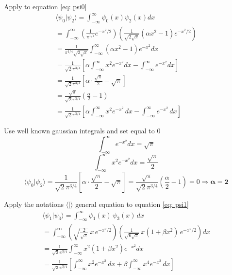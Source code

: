 \documentclass[12pt]{article}
\begin{document}
        Apply to equation \ref{eq: psi0}
        \begin{equation}
            \begin{split}
                \langle \psi_0 | \psi_2 \rangle = \int_{-\infty}^{\infty} \psi_0(x) \psi_2(x) dx \\
                = \int_{-\infty}^{\infty} \left( \frac{1}{\pi^{1/4}} e^{-x^2/2} \right) \left( \frac{1}{\sqrt{2\sqrt{\pi}}} (\alpha x^2 - 1) e^{-x^2/2} \right) \\
                = \frac{1}{\pi^{1/4} \sqrt{2\sqrt{\pi}}} \int_{-\infty}^{\infty}  (\alpha x^2 - 1) e^{-x^2} dx \\
                = \frac{1}{\sqrt{2} \pi^{3/4}} \left[ \alpha \int_{-\infty}^{\infty} x^2 e^{-x^2} dx - \int_{-\infty}^{\infty} e^{-x^2} dx \right] \\
                = \frac{1}{\sqrt{2} \pi^{3/4}} \left[ \alpha \cdot \frac{\sqrt{\pi}}{2} - \sqrt{\pi} \right] \\
                = \frac{\sqrt{\pi}}{\sqrt{2} \pi^{3/4}} \left( \frac{\alpha}{2} - 1 \right) \\
                = \frac{1}{\sqrt{2} \pi^{3/4}} \left[ \alpha \int_{-\infty}^{\infty} x^2 e^{-x^2} \, dx - \int_{-\infty}^{\infty} e^{-x^2} \, dx \right]
            \end{split}
        \end{equation}

        Use well known gaussian integrals and set equal to 0
        \[
            \int_{-\infty}^{\infty} e^{-x^2}dx = \sqrt{\pi}
        \]
        \[
            \int_{-\infty}^{\infty} x^2 e^{-x^2}dx = \frac{\sqrt{\pi}}{2}
        \]
        \[
            \langle \psi_0 | \psi_2 \rangle = \frac{1}{\sqrt{2} \pi^{3/4}} \left[ \alpha \cdot \frac{\sqrt{\pi}}{2} - \sqrt{\pi} \right] = \frac{\sqrt{\pi}}{\sqrt{2} \pi^{3/4}} \left( \frac{\alpha}{2} - 1 \right) = 0 \Rightarrow \boldsymbol{\boxed{\alpha = 2}}
        \]

        Apply the notations $\langle|\rangle$ general equation to equation \ref{eq: psi1}
        \begin{equation}
            \begin{split}
                \langle \psi_1 | \psi_3 \rangle = \int_{-\infty}^{\infty} \psi_1(x)\, \psi_3(x)\, dx \\
                = \int_{-\infty}^{\infty} \left( \sqrt{\frac{2}{\sqrt{\pi}}} \, x \, e^{-x^2/2} \right) \left( \frac{1}{\sqrt{6\sqrt{\pi}}} \, x(1 + \beta x^2) \, e^{-x^2/2} \right) dx \\
                = \frac{1}{\sqrt{3} \pi^{3/4}} \int_{-\infty}^{\infty} x^2 (1 + \beta x^2) e^{-x^2} dx \\
                = \frac{1}{\sqrt{3} \pi^{3/4}} \left[ \int_{-\infty}^{\infty} x^2 e^{-x^2} \, dx + \beta \int_{-\infty}^{\infty} x^4 e^{-x^2} \, dx \right]
            \end{split}
        \end{equation}
\end{document}
